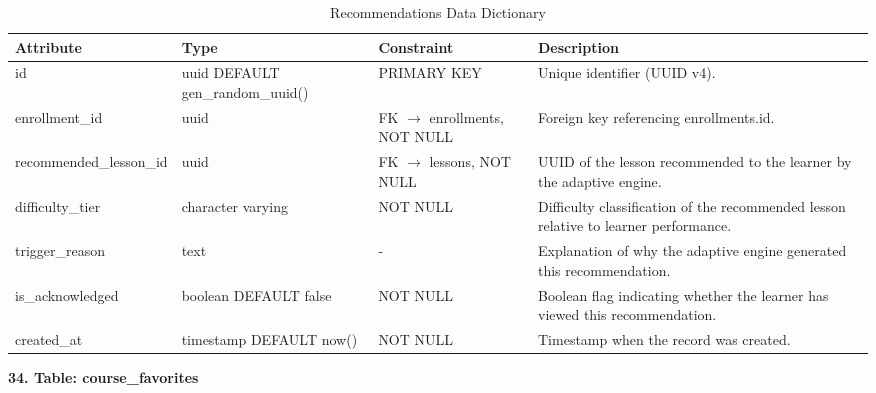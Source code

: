 \documentclass[12pt, oneside]{article} %
\newcommand{\tabbreak}{\hyphenpenalty=200\exhyphenpenalty=200\tolerance=4000\hbadness=10000\hspace{0pt}}
\begin{document}
\begin{table}[H]
\caption{Recommendations Data Dictionary}
\label{tab:dd_recommendations}
\vspace{-4mm}
\begin{center}
\renewcommand{\arraystretch}{1.15}
\scriptsize
\begin{tabular}{|>{\raggedright\arraybackslash\tabbreak}p{2.67cm}|>{\raggedright\arraybackslash\tabbreak}p{2.93cm}|>{\raggedright\arraybackslash\tabbreak}p{2.67cm}|>{\raggedright\arraybackslash\tabbreak}p{4.51cm}|}
\hline
\textbf{Attribute} & \textbf{Type} & \textbf{Constraint} & \textbf{Description} \\ \hline
id & uuid DEFAULT gen\_random\_uuid() & PRIMARY KEY & Unique identifier (UUID v4). \\ \hline
enrollment\_id & uuid & FK $\rightarrow$ enrollments, NOT NULL & Foreign key referencing enrollments.id. \\ \hline
recommended\_lesson\_id & uuid & FK $\rightarrow$ lessons, NOT NULL & UUID of the lesson recommended to the learner by the adaptive engine. \\ \hline
difficulty\_tier & character varying & NOT NULL & Difficulty classification of the recommended lesson relative to learner performance. \\ \hline
trigger\_reason & text & - & Explanation of why the adaptive engine generated this recommendation. \\ \hline
is\_acknowledged & boolean DEFAULT false & NOT NULL & Boolean flag indicating whether the learner has viewed this recommendation. \\ \hline
created\_at & timestamp DEFAULT now() & NOT NULL & Timestamp when the record was created. \\ \hline
\end{tabular}
\end{center}
\end{table}

\textbf{34. Table: course\_favorites}
\end{document}
